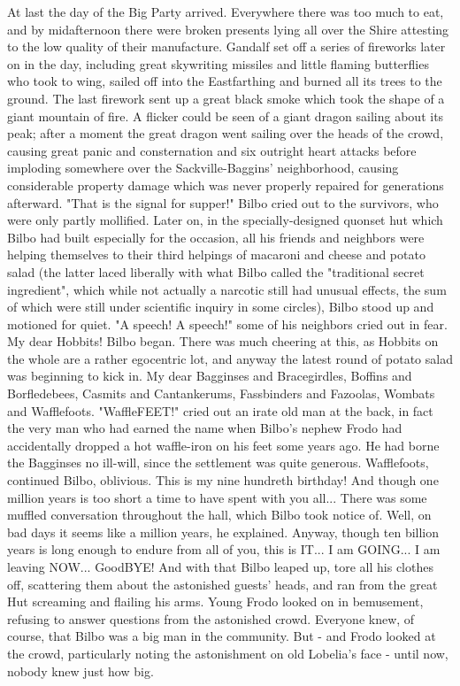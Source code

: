      At last the day of the Big Party arrived. Everywhere there was too 
much to eat, and by midafternoon there were broken presents lying all 
over the Shire attesting to the low quality of their manufacture. Gandalf 
set off a series of fireworks later on in the day, including great 
skywriting missiles and little flaming butterflies who took to wing, 
sailed off into the Eastfarthing and burned all its trees to the ground.
     The last firework sent up a great black smoke which took the shape 
of a giant mountain of fire. A flicker could be seen of a giant dragon 
sailing about its peak; after a moment the great dragon went sailing over 
the heads of the crowd, causing great panic and consternation and six 
outright heart attacks before imploding somewhere over the 
Sackville-Baggins' neighborhood, causing considerable property damage 
which was never properly repaired for generations afterward.
     "That is the signal for supper!" Bilbo cried out to the survivors, 
who were only partly mollified.
     Later on, in the specially-designed quonset hut which Bilbo had 
built especially for the occasion, all his friends and neighbors were 
helping themselves to their third helpings of macaroni and cheese and 
potato salad (the latter laced liberally with what Bilbo called the 
"traditional secret ingredient", which while not actually a narcotic 
still had unusual effects, the sum of which were still under scientific 
inquiry in some circles), Bilbo stood up and motioned for quiet. "A 
speech! A speech!" some of his neighbors cried out in fear.
     My dear Hobbits! Bilbo began. There was much cheering at this, 
as Hobbits on the whole are a rather egocentric lot, and anyway the 
latest round of potato salad was beginning to kick in.
     My dear Bagginses and Bracegirdles, Boffins and Borfledebees, 
Casmits and Cantankerums, Fassbinders and Fazoolas, Wombats and 
Wafflefoots. "WaffleFEET!" cried out an irate old man at the back, in 
fact the very man who had earned the name when Bilbo's nephew Frodo had 
accidentally dropped a hot waffle-iron on his feet some years ago. He had 
borne the Bagginses no ill-will, since the settlement was quite generous.
     Wafflefoots, continued Bilbo, oblivious. This is my nine hundreth 
birthday! And though one million years is too short a time to have spent 
with you all...
     There was some muffled conversation throughout the hall, which Bilbo 
took notice of. Well, on bad days it seems like a million years, he 
explained. Anyway, though ten billion years is long enough to endure 
from all of you, this is IT... I am GOING... I am leaving NOW... 
GoodBYE! And with that Bilbo leaped up, tore all his clothes off, 
scattering them about the astonished guests' heads, and ran from the 
great Hut screaming and flailing his arms.
     Young Frodo looked on in bemusement, refusing to answer questions 
from the astonished crowd. Everyone knew, of course, that Bilbo was a big 
man in the community. But - and Frodo looked at the crowd, particularly 
noting the astonishment on old Lobelia's face - until now, nobody knew just 
how big.

